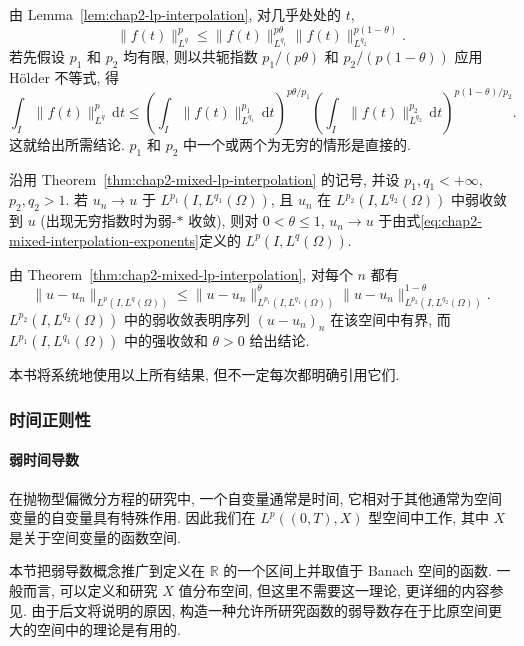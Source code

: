 \begin{Proof}
由 Lemma~\ref{lem:chap2-lp-interpolation}, 对几乎处处的 $t$,
\[
 \|f(t)\|_{L^q}^p\leq
 \|f(t)\|_{L^{q_1}}^{p\theta}
 \|f(t)\|_{L^{q_2}}^{p(1-\theta)}.
\]
若先假设 $p_1$ 和 $p_2$ 均有限, 则以共轭指数 $p_1/(p\theta)$ 和 $p_2/(p(1-\theta))$ 应用 H\"older 不等式, 得
\[
 \int_I\|f(t)\|_{L^q}^p\,\mathrm{d}t
 \leq
 \left(\int_I\|f(t)\|_{L^{q_1}}^{p_1}\,\mathrm{d}t\right)^{p\theta/p_1}
 \left(\int_I\|f(t)\|_{L^{q_2}}^{p_2}\,\mathrm{d}t\right)^{p(1-\theta)/p_2}.
\]
这就给出所需结论. $p_1$ 和 $p_2$ 中一个或两个为无穷的情形是直接的.
\end{Proof}

\begin{Corollary}
\label{cor:chap2-mixed-lp-intermediate-convergence}
沿用 Theorem~\ref{thm:chap2-mixed-lp-interpolation} 的记号, 并设 $p_1,q_1<+\infty$, $p_2,q_2>1$. 若 $u_n\to u$ 于 $L^{p_1}(I,L^{q_1}(\Omega))$, 且 $u_n$ 在 $L^{p_2}(I,L^{q_2}(\Omega))$ 中弱收敛到 $u$ (出现无穷指数时为弱-$*$ 收敛), 则对 $0<\theta\leq1$, $u_n\to u$ 于由式\eqref{eq:chap2-mixed-interpolation-exponents}定义的 $L^p(I,L^q(\Omega))$.
\end{Corollary}

\begin{Proof}
由 Theorem~\ref{thm:chap2-mixed-lp-interpolation}, 对每个 $n$ 都有
\[
 \|u-u_n\|_{L^p(I,L^q(\Omega))}
 \leq
 \|u-u_n\|_{L^{p_1}(I,L^{q_1}(\Omega))}^{\theta}
 \|u-u_n\|_{L^{p_2}(I,L^{q_2}(\Omega))}^{1-\theta}.
\]
$L^{p_2}(I,L^{q_2}(\Omega))$ 中的弱收敛表明序列 $(u-u_n)_n$ 在该空间中有界, 而 $L^{p_1}(I,L^{q_1}(\Omega))$ 中的强收敛和 $\theta>0$ 给出结论.
\end{Proof}

本书将系统地使用以上所有结果, 但不一定每次都明确引用它们.

\subsubsection{时间正则性}
\label{subsec:chap2-time-regularity}

\paragraph{弱时间导数}

在抛物型偏微分方程的研究中, 一个自变量通常是时间, 它相对于其他通常为空间变量的自变量具有特殊作用. 因此我们在 $L^p((0,T),X)$ 型空间中工作, 其中 $X$ 是关于空间变量的函数空间.

本节把弱导数概念推广到定义在 $\mathbb{R}$ 的一个区间上并取值于 Banach 空间的函数. 一般而言, 可以定义和研究 $X$ 值分布空间, 但这里不需要这一理论, 更详细的内容参见. 由于后文将说明的原因, 构造一种允许所研究函数的弱导数存在于比原空间更大的空间中的理论是有用的.

